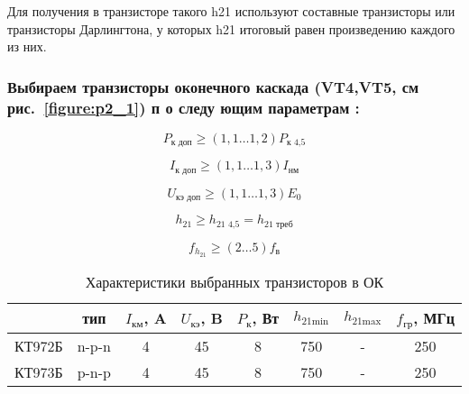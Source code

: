 \begin{equation*}
 
\end{equation*}

Для получения в транзисторе такого h21 используют составные транзисторы или транзисторы Дарлингтона, у которых h21 итоговый равен произведению каждого из них.

\subsubsection{Выбираем транзисторы оконечного каскада (VT4,VT5, см рис.~\ref{figure:p2_1}) п о следу ющим параметрам :}

\begin{equation}
\label{eq:equation2_7}
 P_{\text{к доп}}  \geq (1,1 \ldots 1,2) P_{\text{к 4,5}}
\end{equation}
\begin{equation*}
 
\end{equation*}

\begin{equation}
\label{eq:equation2_8}
 I_{\text{к доп}}  \geq (1,1 \ldots 1,3) I_{\text{нм}}
\end{equation}
\begin{equation*}
 
\end{equation*}

\begin{equation}
\label{eq:equation2_9}
 U_{\text{кэ доп}}  \geq (1,1 \ldots 1,3) E_{\text{0}}
\end{equation}
\begin{equation*}
 
\end{equation*}

\begin{equation}
\label{eq:equation2_10}
 h_{21}  \geq h_{\text{21 4,5}} = h_{\text{21 треб}}
\end{equation}
\begin{equation*}
 
\end{equation*}

\begin{equation}
\label{eq:equation2_11}
 f_{h_{21}}  \geq (2 \ldots 5) f_{\text{в}}
\end{equation}
\begin{equation*}
 
\end{equation*}

\begin{table}[htbp]
\caption{Характеристики выбранных транзисторов в ОК}
\begin{center}\begin{tabular}{|c|c|c|c|c|c|c|c|}
\hline 
  & тип & $I_{\text{км}}$, A & $U_{\text{кэ}}$, B & $P_{\text{к}}$, Вт & $h_{\text{21min}}$ & $h_{\text{21max}}$ & $f_{\text{гр}}$, МГц \\ 
\hline 
КТ972Б & n-p-n & 4 & 45 & 8 & 750 & - & 250 \\ 
\hline 
КТ973Б & p-n-p & 4 & 45 & 8 & 750 & - & 250 \\ 
\hline 
\end{tabular} 
\end{center}
\end{table}

